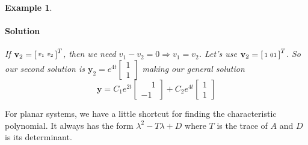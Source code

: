 \documentclass[letterpaper, 11pt, openany]{book}
\theoremstyle{mytheoremstyle}
\theoremstyle{myexamplestyle}
\newtheorem{example}{Example}[section]
\newenvironment{solution}{\paragraph{\sffamily \smaller \fontseries{b}\selectfont Solution}}{\hfill\faSquare}
\begin{document}
\begin{example}
\begin{solution}
        If \(\mathbf{v}_{2} = \begin{bsmallmatrix}
            v_1 & v_2
        \end{bsmallmatrix}^{T}\), then we need \(v_1 - v_2 = 0 \Rightarrow v_1 = v_2\). Let's use \(\mathbf{v}_{2} = \begin{bsmallmatrix}
            1 & 01
        \end{bsmallmatrix}^{T}\). So our second solution is \(\mathbf{y}_{2} = e^{4t} \begin{bmatrix}
            1 \\ 1
        \end{bmatrix}\)
        making our general solution
        \[\mathbf{y} = C_{1} e^{2t} \begin{bmatrix}\phantom{-}1 \\ -1\end{bmatrix} + C_{2} e^{4t} \begin{bmatrix}1 \\ 1\end{bmatrix}\]
    \end{solution}
\end{example}

For planar systems, we have a little shortcut for finding the characteristic polynomial. It always has the form \(\lambda^{2} - T\lambda + D\) where \(T\) is the trace of \(A\) and \(D\) is its determinant.
 
\end{document}

